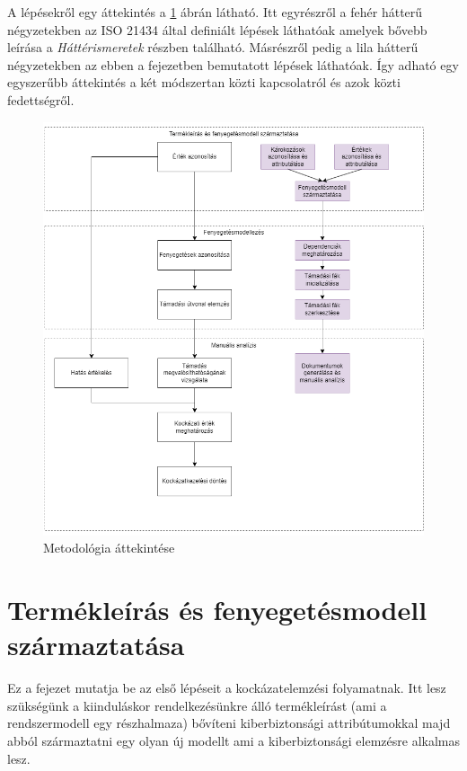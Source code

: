 A lépésekről egy áttekintés a \ref{fig:04_OVERVIEW} ábrán látható. Itt egyrészről a fehér hátterű négyzetekben az ISO 21434 által definiált lépések láthatóak amelyek bővebb leírása a \textit{Háttérismeretek} részben található. Másrészről pedig a lila hátterű négyzetekben az ebben a fejezetben bemutatott lépések láthatóak. Így adható egy egyszerűbb áttekintés a két módszertan közti kapcsolatról és azok közti fedettségről.

\begin{figure}[!ht]
	\centering
	\includegraphics[width=130mm, keepaspectratio]{figures/04_overview.png}
	\caption{Metodológia áttekintése}
	\label{fig:04_OVERVIEW}
\end{figure}

\section{Termékleírás és fenyegetésmodell származtatása}

Ez a fejezet mutatja be az első lépéseit a kockázatelemzési folyamatnak. Itt lesz szükségünk a kiinduláskor rendelkezésünkre álló termékleírást (ami a rendszermodell egy részhalmaza) bővíteni kiberbiztonsági attribútumokkal majd abból származtatni egy olyan új modellt ami a kiberbiztonsági elemzésre alkalmas lesz.

